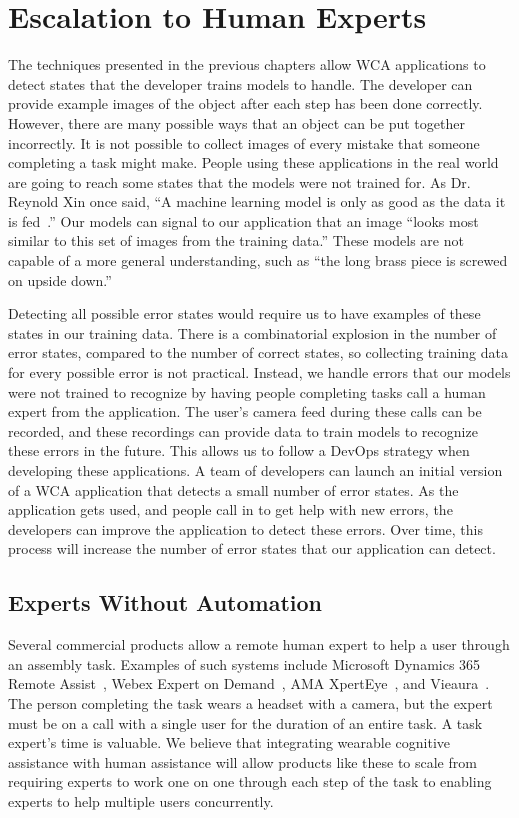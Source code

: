 \chapter{Escalation to Human Experts}\label{chap:escalation}

The techniques presented in the previous chapters allow WCA applications to
detect states that the developer trains models to handle.
The developer can provide example images of the object after each step has been
done correctly.
However, there are many possible ways that an object can be put together
incorrectly.
It is not possible to collect images of every mistake that someone completing a
task might make.
People using these
applications in the real world are going to reach some states that the models
were not trained for. As Dr. Reynold Xin once said,
``A machine learning model is only as good as the data it is fed~\cite{xin}.''
Our models can signal to our application that an image ``looks most similar to
this set of images from the training data.''
These models are not capable of a more general understanding, such as ``the long
brass piece is screwed on upside down.''

Detecting all possible error states would require us to have examples of these
states in our training data. There is a combinatorial explosion in the number of
error states, compared to the number of correct states, so collecting training
data for every possible error is not practical.
Instead, we handle errors that our models were not trained to recognize by
having people completing tasks call a human expert from the application.
The user's camera feed during these calls can be recorded, and these recordings
can provide data to train models to recognize these errors in the future.
This allows us to follow a DevOps strategy when developing these applications.
A team of developers can launch an initial version of a WCA application that
detects a small number of error states.
As the application gets used, and people call in to get help with new errors,
the developers can improve the application to detect these errors.
Over time, this process will increase the number of error states that our
application can detect.

\section{Experts Without Automation}

Several commercial products allow a remote human expert to help a user through
an assembly task.
Examples of such systems include Microsoft Dynamics 365 Remote
Assist~\cite{dynamics365}, Webex Expert on Demand~\cite{webex},
AMA XpertEye~\cite{xpert}, and Vieaura~\cite{vieaura}.
The person completing the task wears a headset with a camera, but the expert
must be on a call with a single user for the duration of an entire task.
A task expert's time is valuable.
We believe that integrating wearable cognitive assistance with
human assistance will allow products like these to scale from requiring
experts to work one on one through each step of the task to enabling experts to
help multiple users concurrently.

